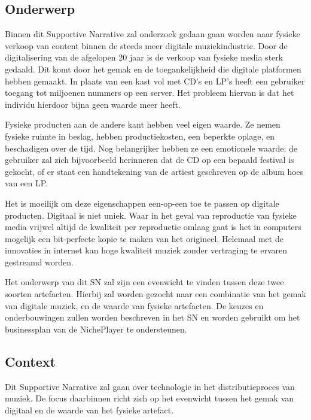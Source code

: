 \subsection{Onderwerp}
Binnen dit Supportive Narrative zal onderzoek gedaan gaan worden naar fysieke verkoop van content binnen de steeds meer digitale muziekindustrie. Door de digitalisering van de afgelopen 20 jaar is de verkoop van fysieke media sterk gedaald.  Dit komt door het gemak en de toegankelijkheid die digitale platformen hebben gemaakt. In plaats van een kast vol met CD's en LP's heeft een gebruiker toegang tot miljoenen nummers op een server. Het probleem hiervan is dat het individu hierdoor bijna geen waarde meer heeft.

Fysieke producten aan de andere kant hebben veel eigen waarde. Ze nemen fysieke ruimte in beslag, hebben productiekosten, een beperkte oplage, en beschadigen over de tijd. Nog belangrijker hebben ze een emotionele waarde; de gebruiker zal zich bijvoorbeeld herinneren dat de CD op een bepaald festival is gekocht, of er staat een handtekening van de artiest geschreven op de album hoes van een LP.

Het is moeilijk om deze eigenschappen een-op-een toe te passen op digitale producten. Digitaal is niet uniek. Waar in het geval van reproductie van fysieke media vrijwel altijd de kwaliteit per reproductie omlaag gaat is het in computers mogelijk een bit-perfecte kopie te maken van het origineel. Helemaal met de innovaties in internet kan hoge kwaliteit muziek zonder vertraging te ervaren gestreamd worden.

Het onderwerp van dit SN zal zijn een evenwicht te vinden tussen deze twee soorten artefacten. Hierbij zal worden gezocht naar een combinatie van het gemak van digitale muziek, en de waarde van fysieke artefacten. De keuzes en onderbouwingen zullen worden beschreven in het SN en worden gebruikt om het businessplan van de NichePlayer te ondersteunen.

\subsection{Context}
Dit Supportive Narrative zal gaan over technologie in het distributieproces van muziek. De focus daarbinnen richt zich op het evenwicht tussen het gemak van digitaal en de waarde van het fysieke artefact.

